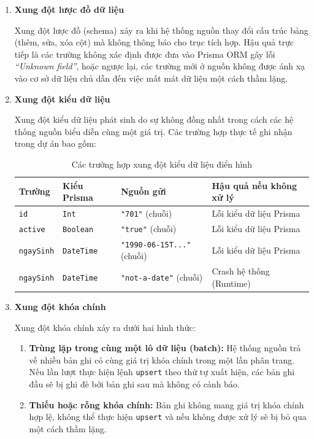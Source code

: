 \begin{enumerate}
    \item \textbf{Xung đột lược đồ dữ liệu}

    Xung đột lược đồ (schema) xảy ra khi hệ thống nguồn thay đổi cấu trúc bảng (thêm, sửa, xóa cột) mà không thông báo cho trục tích hợp. Hậu quả trực tiếp là các trường không xác định được đưa vào Prisma ORM gây lỗi \textit{``Unknown field''}, hoặc ngược lại, các trường mới ở nguồn không được ánh xạ vào cơ sở dữ liệu chủ dẫn đến việc mất mát dữ liệu một cách thầm lặng.

    \item \textbf{Xung đột kiểu dữ liệu}

    Xung đột kiểu dữ liệu phát sinh do sự không đồng nhất trong cách các hệ thống nguồn biểu diễn cùng một giá trị. Các trường hợp thực tế ghi nhận trong dự án bao gồm:

\begin{table}[H]
\centering
\caption{Các trường hợp xung đột kiểu dữ liệu điển hình}
\begin{tabular}{llll}
\hline
\textbf{Trường} & \textbf{Kiểu Prisma} & \textbf{Nguồn gửi} & \textbf{Hậu quả nếu không xử lý} \\
\hline
\texttt{id}         & \texttt{Int}      & \texttt{"701"} (chuỗi)          & Lỗi kiểu dữ liệu Prisma \\
\texttt{active}     & \texttt{Boolean}  & \texttt{"true"} (chuỗi)         & Lỗi kiểu dữ liệu Prisma \\
\texttt{ngaySinh}   & \texttt{DateTime} & \texttt{"1990-06-15T..."} (chuỗi) & Lỗi kiểu dữ liệu Prisma \\
\texttt{ngaySinh}   & \texttt{DateTime} & \texttt{"not-a-date"} (chuỗi)   & Crash hệ thống (Runtime) \\
\hline
\end{tabular}
\end{table}

 \item \textbf{Xung đột khóa chính}

Xung đột khóa chính xảy ra dưới hai hình thức:

\begin{enumerate}
    \item \textbf{Trùng lặp trong cùng một lô dữ liệu (batch):} Hệ thống nguồn trả về nhiều bản ghi có cùng giá trị khóa chính trong một lần phân trang. Nếu lần lượt thực hiện lệnh \texttt{upsert} theo thứ tự xuất hiện, các bản ghi đầu sẽ bị ghi đè bởi bản ghi sau mà không có cảnh báo.
    \item \textbf{Thiếu hoặc rỗng khóa chính:} Bản ghi không mang giá trị khóa chính hợp lệ, không thể thực hiện \texttt{upsert} và nếu không được xử lý sẽ bị bỏ qua một cách thầm lặng.
\end{enumerate}


\end{enumerate}
